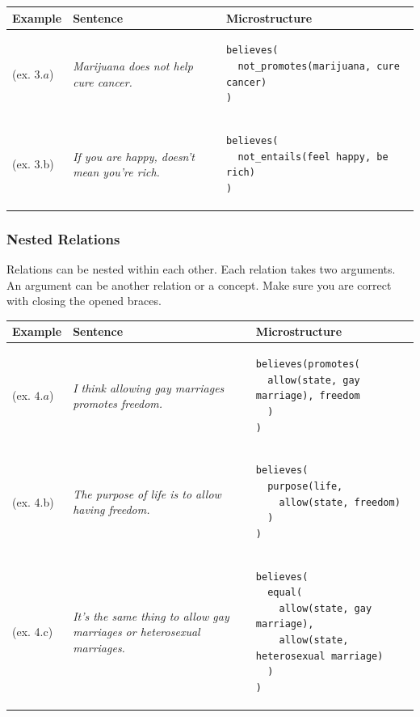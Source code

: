 \begin{table}[h!]
\begin{footnotesize}
\begin{tabular}{@{}m{1.5cm} m{5cm} m{8cm}}
\toprule
Example & Sentence & Microstructure \\
\midrule
(ex. $3.a$) & \textit{Marijuana does not help cure cancer. } & 
\begin{verbatim}
believes(
  not_promotes(marijuana, cure cancer)
)
\end{verbatim}
\\
(ex. 3.b) & \textit{If you are happy, doesn’t mean you’re rich.} 
 &
\begin{verbatim}
believes(
  not_entails(feel happy, be rich)
)
\end{verbatim} 
\\
\bottomrule
\end{tabular}
\end{footnotesize}
\end{table}

\subsubsection*{Nested Relations}

Relations can be nested within each other. Each relation takes two arguments.
An argument can be another relation or a concept. Make sure you are correct
with closing the opened braces. 

\begin{table}[h!]
\begin{footnotesize}
\begin{tabular}{@{}m{1.5cm} m{5cm} m{8cm}}
\toprule
Example & Sentence & Microstructure \\
\midrule
(ex. $4.a$) & \textit{I think allowing gay marriages promotes freedom. } & 
\begin{verbatim}
believes(promotes(
  allow(state, gay marriage), freedom
  )
)
\end{verbatim}
\\
(ex. 4.b) & \textit{The purpose of life is to allow having freedom.} 
 &
\begin{verbatim}
believes(
  purpose(life, 
    allow(state, freedom)
  )
)
\end{verbatim} 
\\
(ex. 4.c) & \textit{It’s the same thing to allow gay marriages or heterosexual marriages.} & 
\begin{verbatim}
believes(
  equal(
    allow(state, gay marriage), 
    allow(state, heterosexual marriage)
  )
)
\end{verbatim}
\\
\bottomrule
\end{tabular}
\end{footnotesize}
\end{table}

